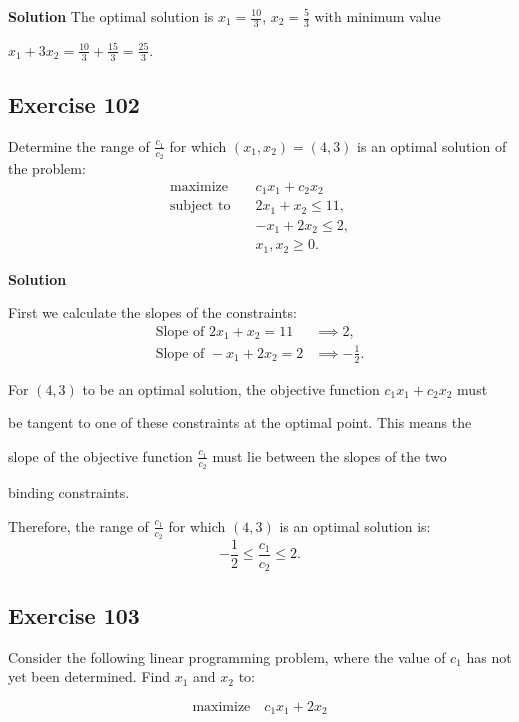 \documentclass{article}
\begin{document}
\textbf{Solution}
The optimal solution is \( x_1 = \frac{10}{3} \), \( x_2 = \frac{5}{3} \) with minimum value 

\( x_1 + 3x_2 = \frac{10}{3} + \frac{15}{3} = \frac{25}{3} \).

\subsection*{Exercise 102}
Determine the range of \( \frac{c_1}{c_2} \) for which \( (x_1, x_2) = (4, 3) \) is an optimal solution of the problem:
\[
\begin{aligned}
    \text{maximize} \quad & c_1 x_1 + c_2 x_2 \\
    \text{subject to} \quad & 2x_1 + x_2 \leq 11, \\
    & -x_1 + 2x_2 \leq 2, \\
    & x_1, x_2 \geq 0.
\end{aligned}
\]

\textbf{Solution}

First we calculate the slopes of the constraints:
\[
\begin{aligned}
    \text{Slope of } 2x_1 + x_2 = 11 &\implies 2, \\
    \text{Slope of } -x_1 + 2x_2 = 2 &\implies -\frac{1}{2}.
\end{aligned}
\]

For \( (4, 3) \) to be an optimal solution, the objective function \( c_1 x_1 + c_2 x_2 \) must 

be tangent to one of these constraints at the optimal point. This means the 

slope of the objective function \( \frac{c_1}{c_2} \) must lie between the slopes of the two 

binding constraints.

\vspace{\baselineskip}

Therefore, the range of \( \frac{c_1}{c_2} \) for which \( (4, 3) \) is an optimal solution is:
\[
-\frac{1}{2} \leq \frac{c_1}{c_2} \leq 2.
\]

\subsection*{Exercise 103}

Consider the following linear programming problem, where the value of \( c_1 \) has not yet been determined. Find \( x_1 \) and \( x_2 \) to:

\[
\text{maximize} \quad c_1 x_1 + 2 x_2
\]
\end{document}
